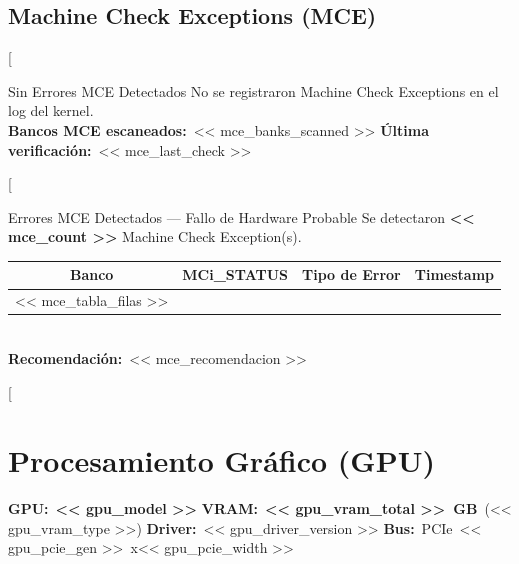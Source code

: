 \documentclass[11pt, a4paper, final]{article}
\newcommand{\mv}[1]{\textcolor{AMPrimary}{\textbf{#1}}}
\begin{document}
\subsection{Machine Check Exceptions (MCE)}

[%
\begin{amboxok}{Sin Errores MCE Detectados}
  \small
  No se registraron Machine Check Exceptions en el log del kernel.\\[3pt]
  \textbf{Bancos MCE escaneados:}\ << mce_banks_scanned >>\quad
  \textbf{Última verificación:}\ << mce_last_check >>
\end{amboxok}
[%
\begin{amboxcrit}{Errores MCE Detectados --- Fallo de Hardware Probable}
  \small
  Se detectaron \mv{<< mce_count >>} Machine Check Exception(s).\\[6pt]
  \begin{tabularx}{\linewidth}{@{} c X X l @{}}
    \toprule
    \rowcolor{StatusCritBg}
    \textbf{Banco} & \textbf{MCi\_STATUS} & \textbf{Tipo de Error} & \textbf{Timestamp} \\
    \midrule
    << mce_tabla_filas >>
    \bottomrule
  \end{tabularx}\\[4pt]
  \textbf{Recomendación:}\ << mce_recomendacion >>
\end{amboxcrit}
[%

\newpage


\section{Procesamiento Gráfico (GPU)}

\begin{componentinfo}
  \small
  \textbf{GPU:}\ \mv{<< gpu_model >>}\hfill
  \textbf{VRAM:}\ \mv{<< gpu_vram_total >>\ GB}\ (<< gpu_vram_type >>)\hfill
  \textbf{Driver:}\ << gpu_driver_version >>\hfill
  \textbf{Bus:}\ PCIe\ << gpu_pcie_gen >>\ x<< gpu_pcie_width >>
\end{componentinfo}

\vspace{0.5cm}


\end{document}
